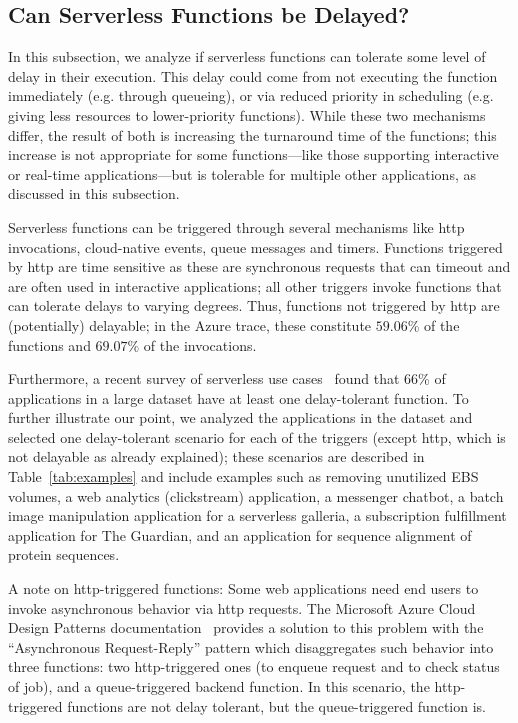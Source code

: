 \subsection{Can Serverless Functions be Delayed?}
\label{sec:motivation:delay-tolerant}
In this subsection, we analyze if serverless functions can tolerate some level of delay in their execution. 
This delay could come from not executing the function immediately (e.g. through queueing), or via reduced priority in scheduling (e.g. giving less resources to lower-priority functions).
While these two mechanisms differ, the result of both is increasing the turnaround time of the functions; this increase is not appropriate for some functions---like those supporting interactive or real-time applications---but is tolerable for multiple other applications, as discussed in this subsection.

Serverless functions can be triggered through several mechanisms like http invocations, cloud-native events, queue messages and timers.
Functions triggered by http are time sensitive as these are synchronous requests that can timeout and are often used in interactive applications;
all other triggers invoke functions that can tolerate delays to varying degrees.
Thus, functions not triggered by http are (potentially) delayable; in the Azure trace, these constitute $59.06\%$ of the functions and $69.07\%$ of the invocations.

Furthermore, a recent survey of serverless use cases~\cite{Eismann:TSE:2021:CommunityConsensus} found that 66\% of applications in a large dataset have at least one delay-tolerant function.
To further illustrate our point, we analyzed the applications in the dataset and selected one delay-tolerant scenario for each of the triggers (except http, which is not delayable as already explained);
these scenarios are described in Table~\ref{tab:examples} and include examples such as removing unutilized EBS volumes, a web analytics (clickstream) application, a messenger chatbot, a batch image manipulation application for a serverless galleria, a subscription fulfillment application for The Guardian, and an application for sequence alignment of protein sequences.

A note on http-triggered functions: Some web applications need end users to invoke asynchronous behavior via http requests.
The Microsoft Azure Cloud Design Patterns documentation~\cite{Eastbury:2022:Azure:AsyncPattern} provides a solution to this problem with the ``Asynchronous Request-Reply'' pattern which disaggregates such behavior into three functions: two http-triggered ones (to enqueue request and to check status of job), and a queue-triggered backend function.
In this scenario, the http-triggered functions are not delay tolerant, but the queue-triggered function is.


